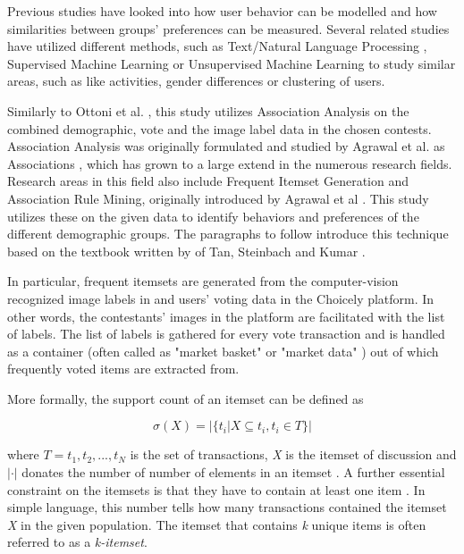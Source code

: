 Previous studies have looked into how user behavior can be modelled and how similarities between groups' preferences can be measured. Several related studies have utilized different methods, such as Text/Natural Language Processing \cite{ottoni2013ladies, farseev2015harvestingmultiplesources, jang2016teensengagemorewithfewerphotos, kabinsingha2012movie, han2016teensarefrommars}, Supervised Machine Learning \cite{chinesemobilebankingusers, saraee2004data, kabinsingha2012movie, farseev2015harvestingmultiplesources, han2016teensarefrommars, jang2015no, bakhshi2014faces} or Unsupervised Machine Learning \cite{saraee2004data, hu2014we, jang2015no} to study similar areas, such as like activities, gender differences or clustering of users. 

Similarly to Ottoni et al. \cite{ottoni2013ladies}, this study utilizes Association Analysis on the combined demographic, vote and the image label data in the chosen contests. Association Analysis was originally formulated and studied by Agrawal et al. as Associations \cite{database_mining_agrawal, mining_association_rules_agrawal}, which has grown to a large extend in the numerous research fields. Research areas in this field also include Frequent Itemset Generation and Association Rule Mining, originally introduced by Agrawal et al \cite{mining_association_rules_agrawal}. This study utilizes these on the given data to identify behaviors and preferences of the different demographic groups. The paragraphs to follow introduce this technique based on the textbook written by of Tan, Steinbach and Kumar \cite{introtodatamining}.

In particular, frequent itemsets are generated from the computer-vision recognized image labels in and users' voting data in the Choicely platform. In other words, the contestants' images in the platform are facilitated with the list of labels. The list of labels is gathered for every vote transaction and is handled as a container (often called as "market basket" or "market data" \cite{Brin97dynamicitemset, Brin1997BeyondMB, Raeder2010MarketBA}) out of which frequently voted items are extracted from. 

More formally, the support count of an itemset can be defined as

\begin{equation}
    \sigma (X) = |\{ t_i | X \subseteq t_i, t_i \in T \}|
\end{equation}

where $T = {t_1, t_2, ..., t_N}$ is the set of transactions, \emph{X} is the itemset of discussion and $| \cdot |$ donates the number of number of elements in an itemset \cite{introtodatamining}. A further essential constraint on the itemsets is that they have to contain at least one item \cite{introtodatamining}. In simple language, this number tells how many transactions contained the itemset \emph{X} in the given population. The itemset that contains \emph{k} unique items is often referred to as a \emph{k-itemset}. 

